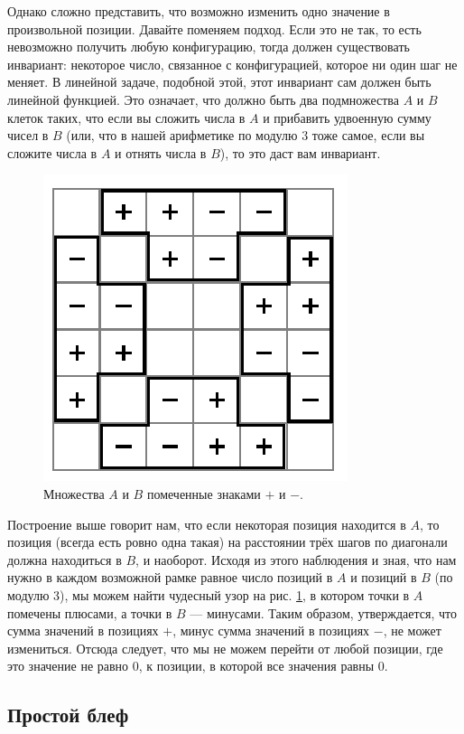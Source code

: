 Однако сложно представить, что возможно изменить одно значение в произвольной позиции.
Давайте поменяем подход.
Если это не так, то есть невозможно получить любую конфигурацию, тогда должен существовать инвариант: некоторое число, связанное с конфигурацией, которое ни один шаг не меняет.
В линейной задаче, подобной этой, этот инвариант сам должен быть линейной функцией.
Это означает, что должно быть два подмножества $A$ и $B$ клеток таких, что если вы сложить числа в $A$ и прибавить удвоенную сумму чисел в $B$ (или, что в нашей арифметике по модулю $3$ тоже самое, если вы сложите числа в $A$ и отнять числа в $B$), то это даст вам инвариант.

\begin{figure}[t!]
\centering
\includegraphics[scale=1]{pics/chess2}
\caption{Множества $A$ и $B$ помеченные знаками $+$ и $-$.}
\label{pic:chess2}
\end{figure}

Построение выше говорит нам, что если некоторая позиция находится в $A$, то позиция (всегда есть ровно одна такая) на расстоянии трёх шагов по диагонали должна находиться в $B$, и наоборот.
Исходя из этого наблюдения и зная, что нам нужно в каждом возможной рамке равное число позиций в $A$ и позиций в $B$ (по модулю 3), мы можем найти чудесный узор на рис. \ref{pic:chess2}, в котором точки в $A$ помечены плюсами, а точки в $B$ --- минусами.
Таким образом, утверждается, что сумма значений в позициях $+$, минус сумма значений в позициях $-$, не может измениться.
Отсюда следует, что мы не можем перейти от любой позиции, где это значение не равно $0$, к позиции, в которой все значения равны $0$.

\subsection*{Простой блеф}

